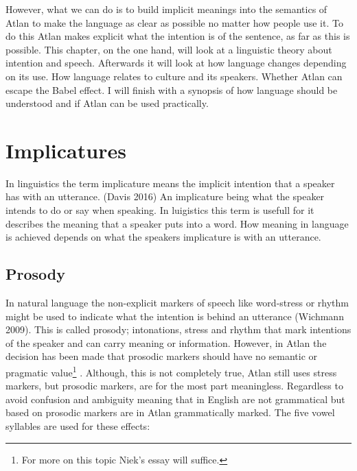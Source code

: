 However, what we can do is to build implicit meanings into the semantics of Atlan to make the language as clear as possible no matter how people use it. To do this Atlan makes explicit what the intention is of the sentence, as far as this is possible. This chapter, on the one hand, will look at a linguistic theory about intention and speech. Afterwards it will look at how language changes depending on its use. How language relates to culture and its speakers. Whether Atlan can escape the Babel effect. I will finish with a synopsis of how language should be understood and if Atlan can be used practically.  

\vspace{-0.5cm}
\section{Implicatures}

In linguistics the term implicature means the implicit intention that a speaker has with an utterance. (Davis 2016) An implicature being what the speaker intends to do or say when speaking. In luigistics this term is usefull for it describes the meaning that a speaker puts into a word. How meaning in language is achieved depends on what the speakers implicature is with an utterance.

\subsection{Prosody}

In natural language the non-explicit markers of speech like word-stress or rhythm might be used to indicate what the intention is behind an utterance (Wichmann 2009). This is called prosody; intonations, stress and rhythm that mark intentions of the speaker and can carry meaning or information. However, in Atlan the decision has been made that prosodic markers should have no semantic or pragmatic value\footnote{For more on this topic Niek’s essay will suffice.} . Although, this is not completely true, Atlan still uses stress markers, but prosodic markers, are for the most part meaningless. Regardless to avoid confusion and ambiguity meaning that in English are not grammatical but based on prosodic markers are in Atlan grammatically marked. The five vowel syllables are used for these effects:

